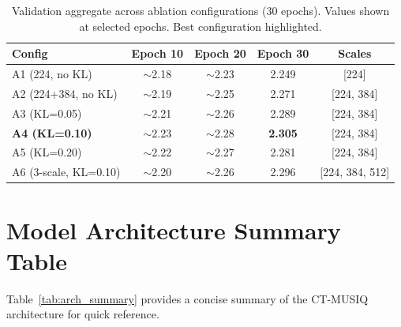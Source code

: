 \begin{table}[h]
    \centering
    \caption{Validation aggregate across ablation configurations (30 epochs).
             Values shown at selected epochs. Best configuration highlighted.}
    \label{tab:ablation_raw}
    \begin{tabular}{lcccc}
        \toprule
        \textbf{Config} & \textbf{Epoch 10} & \textbf{Epoch 20} & \textbf{Epoch 30} & \textbf{Scales} \\
        \midrule
        A1 (224, no KL)      & $\sim$2.18 & $\sim$2.23 & 2.249 & [224] \\
        A2 (224+384, no KL)  & $\sim$2.19 & $\sim$2.25 & 2.271 & [224, 384] \\
        A3 (KL=0.05)         & $\sim$2.21 & $\sim$2.26 & 2.289 & [224, 384] \\
        \textbf{A4 (KL=0.10)}& $\sim$2.23 & $\sim$2.28 & \textbf{2.305} & [224, 384] \\
        A5 (KL=0.20)         & $\sim$2.22 & $\sim$2.27 & 2.281 & [224, 384] \\
        A6 (3-scale, KL=0.10)& $\sim$2.20 & $\sim$2.26 & 2.296 & [224, 384, 512] \\
        \bottomrule
    \end{tabular}
\end{table}

\section{Model Architecture Summary Table}
\label{app:arch_summary}

Table~\ref{tab:arch_summary} provides a concise summary of the CT-MUSIQ architecture
for quick reference.

